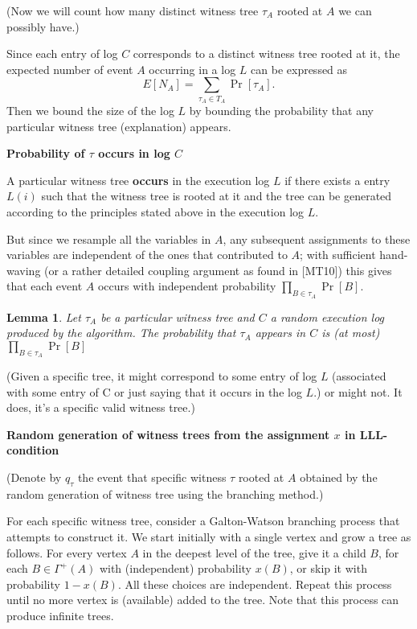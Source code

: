 \documentclass[twoside]{article}
\newtheorem{lemma}[theorem]{Lemma}
\begin{document}
(Now we will count how many distinct witness tree $\tau_A$ rooted at $A$ we can possibly have.)

Since each entry of log $C$ corresponds to a distinct witness tree rooted at it, the expected number of event $A$ occurring in a log $L$ can be expressed as
$$E[N_A]=\sum_{\tau_A \in T_A}\Pr[\tau_A].$$
Then we bound the size of the log $L$ by bounding the probability that any particular witness tree (explanation) appears.

\textbf{Probability of $\tau$ occurs in log $C$}

A particular witness tree \textbf{occurs} in the execution log $L$ if there exists a entry $L(i)$ such that the witness tree is rooted at it and the tree can be generated according to the principles stated above in the execution log $L$.

But since we resample all the variables in $A$, any subsequent assignments to these variables are independent of the
ones that contributed to $A$; with sufficient hand-waving (or a rather detailed coupling argument as found in [MT10]) this gives that each event $A$ occurs with independent probability $\prod_{B\in\tau_A}\Pr[B]$.

\begin{lemma}
Let $\tau_A$ be a particular witness tree and $C$ a random execution log produced by the algorithm. The probability that $\tau_A$ appears in $C$ is (at most) $\prod_{B\in\tau_A}\Pr[B]$
\end{lemma}

(Given a specific tree, it might correspond to some entry of log $L$ (associated with some entry of C or just saying that it occurs in the log $L$.) or might not. It does, it's a specific valid witness tree.)

\textbf{Random generation of witness trees from the assignment $x$ in LLL-condition}

(Denote by $q_{\tau}$  the event that specific witness $\tau$ rooted at $A$ obtained by the random generation of witness tree using the branching method.)

For each specific witness tree, consider a Galton-Watson branching process that attempts to construct it. We start initially with a single vertex and grow a tree as follows. For every vertex $A$ in the deepest level of the tree, give it a child $B$, for each $B\in \Gamma^+(A)$ with (independent) probability $x(B)$, or skip it with probability $1-x(B)$. All these choices are independent. Repeat this process until no more vertex is (available) added to the tree. Note that this process can produce infinite trees.
\end{document}
